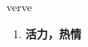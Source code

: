 
\begin{frame}
{\huge verve}
\begin{center}
\begin{enumerate}\Large
  \item \textbf{活力，热情}
\end{enumerate}
\end{center}
\end{frame}
